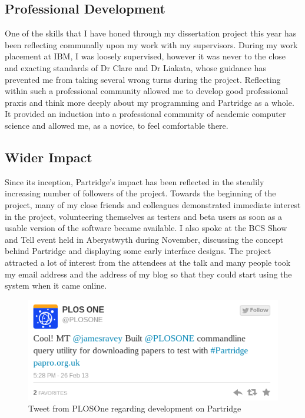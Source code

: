 \subsection{Professional Development}

One of the skills that I have honed through my dissertation project this year
has been reflecting communally upon my work with my supervisors. During my work
placement at IBM, I was loosely supervised, however it was never to the close
and exacting standards of Dr Clare and Dr Liakata, whose guidance has 
prevented me from taking several wrong turns during the project. Reflecting
within such a professional community allowed me to develop good professional
praxis and think more deeply about my programming and Partridge as a whole. It
provided an induction into a professional community of academic computer
science and allowed me, as a novice, to feel comfortable there. 


\subsection{Wider Impact}

Since its inception, Partridge's impact has been reflected in the steadily
increasing number of followers of the project. Towards the beginning of the
project, many of my close friends and colleagues demonstrated immediate
interest in the project, volunteering themselves as testers and beta users as
soon as a usable version of the software became available. I also spoke at the
BCS Show and Tell event held in Aberystwyth during November, discussing the
concept behind Partridge and displaying some early interface designs. The
project attracted a lot of interest from the attendees at the talk and many
people took my email address and the address of my blog so that they could
start using the system when it came online.

\begin{figure}[!h]
\centering
\includegraphics[width=\textwidth]{images/evaluation/plostweet.png}
\caption{Tweet from PLOSOne regarding development on Partridge}
\label{fig:plostweet}
\end{figure}

